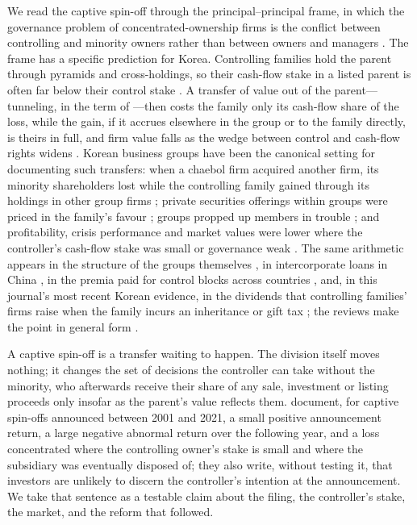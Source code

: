 We read the captive spin-off through the principal--principal frame, in which the governance problem of concentrated-ownership firms is the conflict between controlling and minority owners rather than between owners and managers \cite{young2008}. The frame has a specific prediction for Korea. Controlling families hold the parent through pyramids and cross-holdings, so their cash-flow stake in a listed parent is often far below their control stake \cite{laporta1999, claessens2000}. A transfer of value out of the parent---tunneling, in the term of ---then costs the family only its cash-flow share of the loss, while the gain, if it accrues elsewhere in the group or to the family directly, is theirs in full, and firm value falls as the wedge between control and cash-flow rights widens \cite{claessens2002, masulis2011}. Korean business groups have been the canonical setting for documenting such transfers: when a chaebol firm acquired another firm, its minority shareholders lost while the controlling family gained through its holdings in other group firms \cite{bae2002}; private securities offerings within groups were priced in the family's favour \cite{baek2006}; groups propped up members in trouble \cite{bae2008}; and profitability, crisis performance and market values were lower where the controller's cash-flow stake was small or governance weak \cite{joh2003, mitton2002, black2006}. The same arithmetic appears in the structure of the groups themselves \cite{almeida2011}, in intercorporate loans in China \cite{jiang2010}, in the premia paid for control blocks across countries \cite{dyck2004}, and, in this journal's most recent Korean evidence, in the dividends that controlling families' firms raise when the family incurs an inheritance or gift tax \cite{na2025}; the reviews make the point in general form \cite{young2008, castaner2022, aguilera2025}.

A captive spin-off is a transfer waiting to happen. The division itself moves nothing; it changes the set of decisions the controller can take without the minority, who afterwards receive their share of any sale, investment or listing proceeds only insofar as the parent's value reflects them.  document, for \KLN{} captive spin-offs announced between 2001 and 2021, a small positive announcement return, a large negative abnormal return over the following year, and a loss concentrated where the controlling owner's stake is small and where the subsidiary was eventually disposed of; they also write, without testing it, that investors are unlikely to discern the controller's intention at the announcement. We take that sentence as a testable claim about the filing, the controller's stake, the market, and the reform that followed.

